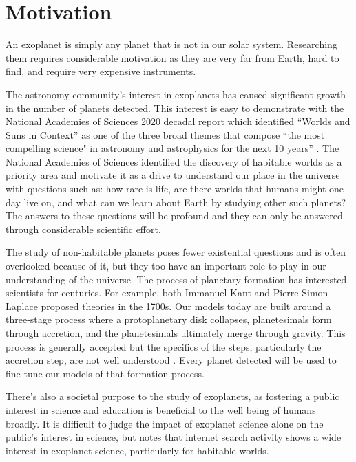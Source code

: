 \section{Motivation}
\label{sec:motivation}

An exoplanet is simply any planet that is not in our solar system. Researching
them requires considerable motivation as they are very far from Earth,
hard to find, and require very expensive instruments. 

The astronomy community's interest in exoplanets has caused significant growth
in the number of planets detected. This interest is easy to demonstrate with
the National Academies of Sciences 2020 decadal report which identified
``Worlds and Suns in Context'' as one of the three broad themes that compose
``the most compelling science" in astronomy and astrophysics for the next 10
years'' \citep{nationalacademiesofsciencesPathwaysDiscoveryAstronomy2021}. The
National Academies of Sciences identified the discovery of habitable worlds as
a priority area and motivate it as a drive to understand our place in the
universe with questions such as: how rare is life, are there worlds that humans
might one day live on, and what can we learn about Earth by studying other such
planets? The answers to these questions will be profound and they can only be
answered through considerable scientific effort.

The study of non-habitable planets poses fewer existential questions and is
often overlooked because of it, but they too have an important role to play in
our understanding of the universe. The process of planetary formation has
interested scientists for centuries. For example, both Immanuel Kant and
Pierre-Simon Laplace proposed theories \citep{Perryman2018a} in the 1700s. Our
models today are built around a three-stage process where a protoplanetary disk
collapses, planetesimals form through accretion, and the planetesimals
ultimately merge through gravity\citep{Jeffery}. This process is generally
accepted but the specifics of the steps, particularly the accretion step, are
not well understood \citep{Perryman2018a}. Every planet detected will be used
to fine-tune our models of that formation process.

There's also a societal purpose to the study of exoplanets, as fostering a
public interest in science and education is beneficial to the well being of
humans broadly. It is difficult to judge the impact of exoplanet science alone
on the public's interest in science, but \citet{deegImpactExoplanet2018} notes
that internet search activity shows a wide interest in exoplanet science,
particularly for habitable worlds.

